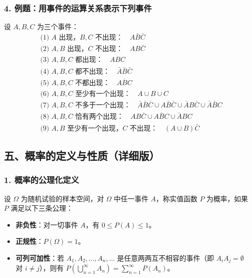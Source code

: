 \documentclass[12pt,a4paper]{ctexart}
\begin{document}
\subsubsection{4. 例题：用事件的运算关系表示下列事件}
设 $A, B, C$ 为三个事件：
\begin{align*}
     & \text{(1) }A\text{ 出现，}B, C\text{ 不出现：}\quad \boxed{A\bar{B}\bar{C}}                                                                 \\
     & \text{(2) }A, B\text{ 出现，}C\text{ 不出现：}\quad \boxed{AB\bar{C}}                                                                       \\
     & \text{(3) }A, B, C\text{ 都出现：}\quad \boxed{ABC}                                                                                      \\
     & \text{(4) }A, B, C\text{ 都不出现：}\quad \boxed{\bar{A}\bar{B}\bar{C}}                                                                   \\
     & \text{(5) }A, B, C\text{ 不都出现：}\quad \boxed{\overline{ABC}}                                                                          \\
     & \text{(6) }A, B, C\text{ 至少有一个出现：}\quad \boxed{A \cup B \cup C}                                                                      \\
     & \text{(7) }A, B, C\text{ 不多于一个出现：}\quad \boxed{\bar{A}\bar{B}\bar{C} \cup A\bar{B}\bar{C} \cup \bar{A}B\bar{C} \cup \bar{A}\bar{B}C} \\
     & \text{(8) }A, B, C\text{ 恰有两个出现：}\quad \boxed{AB\bar{C} \cup A\bar{B}C \cup \bar{A}BC}                                               \\
     & \text{(9) }A, B\text{ 至少有一个出现，}C\text{ 不出现：}\quad \boxed{(A\cup B)\bar{C}}
\end{align*}

\subsection{五、概率的定义与性质（详细版）}

\subsubsection{1. 概率的公理化定义}
设 $\Omega$ 为随机试验的样本空间，对 $\Omega$ 中任一事件 $A$，称实值函数 $P$ 为概率，如果 $P$ 满足以下三条公理：
\begin{itemize}[noitemsep]
    \item \textbf{非负性}：对一切事件 $A$，有 $0 \le P(A) \le 1$。
    \item \textbf{正规性}：$P(\Omega) = 1$。
    \item \textbf{可列可加性}：若 $A_1, A_2, \dots, A_n, \dots$ 是任意两两互不相容的事件（即 $A_i A_j = \emptyset$ 对 $i \ne j$），则有 $P(\bigcup_{n=1}^{\infty} A_n) = \sum_{n=1}^{\infty} P(A_n)$。
\end{itemize}
\end{document}
